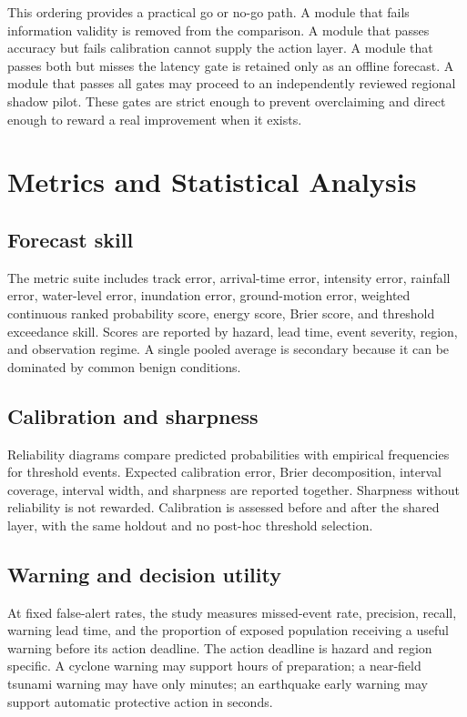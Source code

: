 \documentclass[conference]{IEEEtran}
\begin{document}
This ordering provides a practical go or no-go path. A module that fails information validity is removed from the comparison. A module that passes accuracy but fails calibration cannot supply the action layer. A module that passes both but misses the latency gate is retained only as an offline forecast. A module that passes all gates may proceed to an independently reviewed regional shadow pilot. These gates are strict enough to prevent overclaiming and direct enough to reward a real improvement when it exists.

\section{Metrics and Statistical Analysis}

\subsection{Forecast skill}

The metric suite includes track error, arrival-time error, intensity error, rainfall error, water-level error, inundation error, ground-motion error, weighted continuous ranked probability score, energy score, Brier score, and threshold exceedance skill. Scores are reported by hazard, lead time, event severity, region, and observation regime. A single pooled average is secondary because it can be dominated by common benign conditions.

\subsection{Calibration and sharpness}

Reliability diagrams compare predicted probabilities with empirical frequencies for threshold events. Expected calibration error, Brier decomposition, interval coverage, interval width, and sharpness are reported together. Sharpness without reliability is not rewarded. Calibration is assessed before and after the shared layer, with the same holdout and no post-hoc threshold selection.

\subsection{Warning and decision utility}

At fixed false-alert rates, the study measures missed-event rate, precision, recall, warning lead time, and the proportion of exposed population receiving a useful warning before its action deadline. The action deadline is hazard and region specific. A cyclone warning may support hours of preparation; a near-field tsunami warning may have only minutes; an earthquake early warning may support automatic protective action in seconds.
\end{document}
